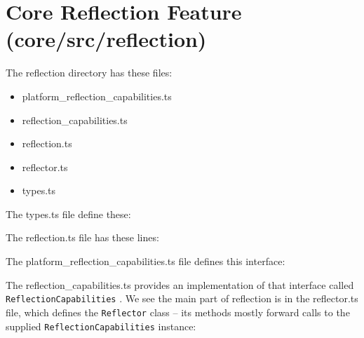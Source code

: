 \section{Core Reflection Feature (core/src/reflection)}

The reflection directory has these files:

\begin{itemize}
  \item platform\_reflection\_capabilities.ts
  \item reflection\_capabilities.ts
  \item reflection.ts
  \item reflector.ts
  \item types.ts
\end{itemize}

The types.ts file define these:



The reflection.ts file has these lines:



The platform\_reflection\_capabilities.ts file defines this interface:



The reflection\_capabilities.ts provides an implementation of that interface called
\texttt{ReflectionCapabilities}
. We see the main part of reflection is in the reflector.ts file,
which defines the
\texttt{Reflector}
class – its methods mostly forward calls to the supplied
\texttt{ReflectionCapabilities}
instance:


